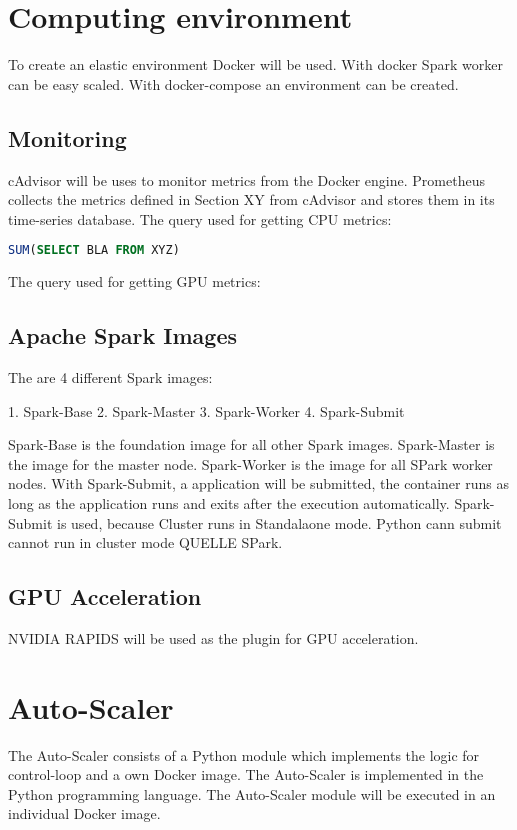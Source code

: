 \section{Computing environment}
To create an elastic environment Docker will be used. With docker Spark worker can be easy scaled. With docker-compose an environment can be created.
\subsection{Monitoring}
cAdvisor will be uses to monitor metrics from the Docker engine. Prometheus collects the metrics defined in Section XY from cAdvisor and stores them in its time-series database.
The query used for getting CPU metrics:

\begin{lstlisting}[language=SQL, caption=Python example]
SUM(SELECT BLA FROM XYZ)
\end{lstlisting}

The query used for getting GPU metrics:


\subsection{Apache Spark Images}
The are 4 different Spark images:

1. Spark-Base
2. Spark-Master
3. Spark-Worker
4. Spark-Submit

Spark-Base is the foundation image for all other Spark images. Spark-Master is the image for the master node. Spark-Worker is the image for all SPark worker nodes. With Spark-Submit, a application will be submitted, the container runs as long as the application runs and exits after the execution automatically. Spark-Submit is used, because Cluster runs in Standalaone mode. Python cann submit cannot run in cluster mode QUELLE SPark.

\subsection{GPU Acceleration}

NVIDIA RAPIDS will be used as the plugin for GPU acceleration.



\section{Auto-Scaler}
The Auto-Scaler consists of a Python module which implements the logic for control-loop and a own Docker image.
The Auto-Scaler is implemented in the Python programming language.
The Auto-Scaler module will be executed in an individual Docker image.

